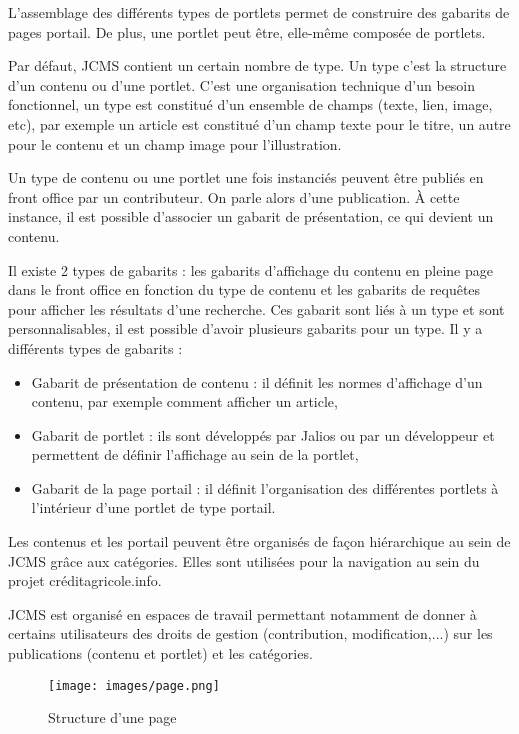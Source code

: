 \documentclass[12pt,a4paper]{article}
\begin{document}
L'assemblage des différents types de portlets permet de construire des gabarits de pages portail. De plus, une portlet peut être, elle-même composée de portlets.\par 
Par défaut, \gls{JCMS} contient un certain nombre de type. Un type c'est la structure d'un contenu ou d'une portlet. C'est une organisation technique d'un besoin fonctionnel, un type est constitué d'un ensemble de champs (texte, lien, image, etc), par exemple un article est constitué d'un champ texte pour le titre, un autre pour le contenu et un champ image pour l'illustration.\par 
Un type de contenu ou une portlet une fois instanciés peuvent être publiés en front office par un contributeur. On parle alors d'une publication. À cette instance, il est possible d'associer un gabarit de présentation, ce qui devient un contenu.\par
Il existe 2 types de gabarits : les gabarits d'affichage du contenu en pleine page dans le front office en fonction du type de contenu et les gabarits de requêtes pour afficher les résultats d'une recherche. Ces gabarit sont liés à un type et sont personnalisables, il est possible d'avoir plusieurs gabarits pour un type. Il y a différents types de gabarits :
\begin{itemize}
\item Gabarit de présentation de contenu : il définit les normes d'affichage d'un contenu, par exemple comment afficher un article,
\item Gabarit de portlet : ils sont développés par Jalios ou par un développeur et permettent de définir l'affichage au sein de la portlet,
\item Gabarit de la page portail : il définit l'organisation des différentes portlets à l'intérieur d'une portlet de type portail.
\end{itemize}\par 
Les contenus et les portail peuvent être organisés de façon hiérarchique au sein de \gls{JCMS} grâce aux catégories. Elles sont utilisées pour la navigation au sein du projet créditagricole.info.\par
\gls{JCMS} est organisé en espaces de travail permettant notamment de donner à certains utilisateurs des droits de gestion (contribution, modification,...) sur les publications (contenu et portlet) et les catégories.\par 
\begin{figure}[h!]
\centering
\texttt{[image: images/page.png]}
\caption{Structure d'une page}
\end{figure}
\end{document}

